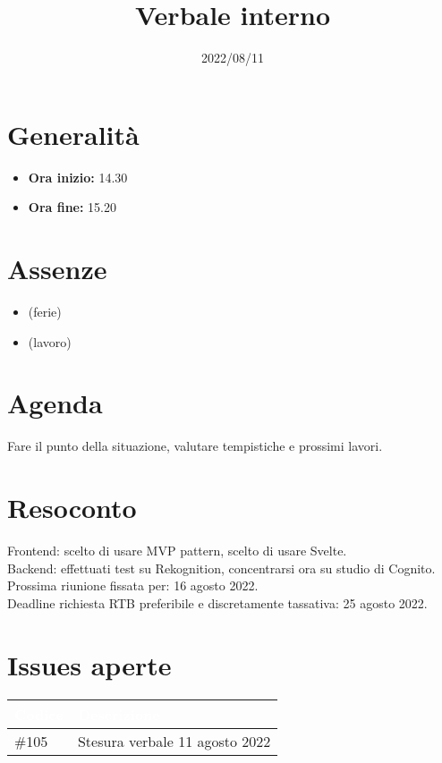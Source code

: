 \documentclass{classes/base}
\title{Verbale interno}
\date{2022/08/11}
\author{\marcob}
\renewcommand{\maketitle}{
    
}
\begin{document}
    \maketitle

    \section*{Generalità}
    \begin{itemize}
        \item \textbf{Ora inizio:} 14.30
        \item \textbf{Ora fine:} 15.20
    \end{itemize}

    \section*{Assenze}
    \begin{itemize}
        \item \marcov{} (ferie)
        \item \ruth{} (lavoro)
    \end{itemize}

    \section*{Agenda}
    Fare il punto della situazione, valutare tempistiche e prossimi lavori.

    \section*{Resoconto}
    Frontend: scelto di usare MVP pattern, scelto di usare Svelte.\\
    Backend: effettuati test su Rekognition, concentrarsi ora su studio di Cognito.\aCapo{}
    Prossima riunione fissata per: 16 agosto 2022.\\
    Deadline richiesta RTB preferibile e discretamente tassativa: 25 agosto 2022.

    \section*{Issues aperte}
    {
        
        \newlength{\freewidth}
        \setlength{\freewidth}{\dimexpr\textwidth-10\tabcolsep}
        \renewcommand{\arraystretch}{1.5}
        \centering
        \setlength{\aboverulesep}{0pt}
        \setlength{\belowrulesep}{0pt}
        \begin{longtable}{C{.13\freewidth} C{\freewidth}}
            \toprule
        \textcolor{white}{\textbf{Codice}}&
        \textcolor{white}{\textbf{Descrizione}}\\	
        \toprule
        \endhead
        
        \#105 & Stesura verbale 11 agosto 2022 \\

        \bottomrule
        \end{longtable}
    }
\end{document}
